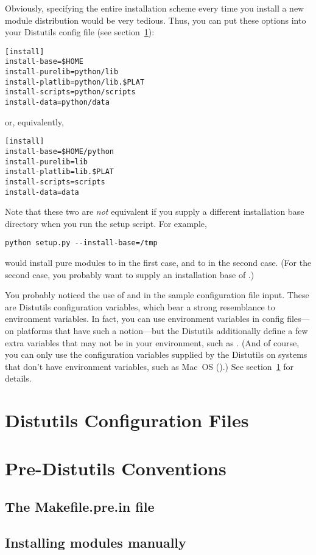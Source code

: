 \documentclass{howto}
\begin{document}
Obviously, specifying the entire installation scheme every time you
install a new module distribution would be very tedious.  Thus, you can
put these options into your Distutils config file (see
section~\ref{sec:config-files}):
\begin{verbatim}
[install]
install-base=$HOME
install-purelib=python/lib
install-platlib=python/lib.$PLAT
install-scripts=python/scripts
install-data=python/data
\end{verbatim}
or, equivalently,
\begin{verbatim}
[install]
install-base=$HOME/python
install-purelib=lib
install-platlib=lib.$PLAT
install-scripts=scripts
install-data=data
\end{verbatim}
Note that these two are \emph{not} equivalent if you supply a different
installation base directory when you run the setup script.  For example,
\begin{verbatim}
python setup.py --install-base=/tmp
\end{verbatim}
would install pure modules to  in the first
case, and to  in the second case.  (For the second
case, you probably want to supply an installation base of
.)

You probably noticed the use of  and  in the
sample configuration file input.  These are Distutils configuration
variables, which bear a strong resemblance to environment variables.  In
fact, you can use environment variables in config files---on platforms
that have such a notion---but the Distutils additionally define a few
extra variables that may not be in your environment, such as
.  (And of course, you can only use the configuration
variables supplied by the Distutils on systems that don't have
environment variables, such as Mac~OS ().)  See
section~\ref{sec:config-files} for details.



\section{Distutils Configuration Files}
\label{sec:config-files}



\section{Pre-Distutils Conventions}
\label{sec:pre-distutils}


\subsection{The Makefile.pre.in file}
\label{sec:makefile-pre-in}


\subsection{Installing modules manually}
\label{sec:manual-install}
\end{document}
